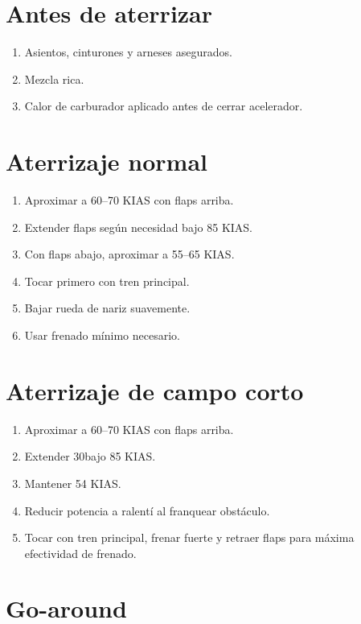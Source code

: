 \documentclass[11pt,oneside]{book}
\newenvironment{checklist}{\begin{enumerate}[label=\arabic*.]}{\end{enumerate}}
\begin{document}
\section{Antes de aterrizar}

\begin{checklist}
\item Asientos, cinturones y arneses asegurados.
\item Mezcla rica.
\item Calor de carburador aplicado antes de cerrar acelerador.
\end{checklist}

\section{Aterrizaje normal}

\begin{checklist}
\item Aproximar a 60--70 KIAS con flaps arriba.
\item Extender flaps según necesidad bajo 85 KIAS.
\item Con flaps abajo, aproximar a 55--65 KIAS.
\item Tocar primero con tren principal.
\item Bajar rueda de nariz suavemente.
\item Usar frenado mínimo necesario.
\end{checklist}

\section{Aterrizaje de campo corto}

\begin{checklist}
\item Aproximar a 60--70 KIAS con flaps arriba.
\item Extender 30\textdegree bajo 85 KIAS.
\item Mantener 54 KIAS.
\item Reducir potencia a ralentí al franquear obstáculo.
\item Tocar con tren principal, frenar fuerte y retraer flaps para máxima efectividad de frenado.
\end{checklist}

\section{Go-around}
\end{document}

